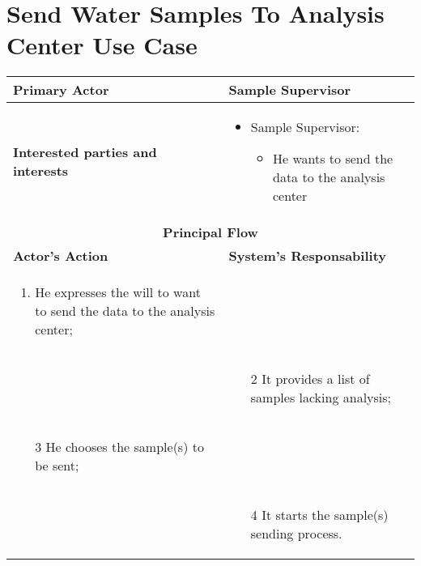 \section{Send Water Samples To Analysis Center Use Case}

\begin{longtable}{|p{7cm}|p{7cm}|}

\hline
\textbf{Primary Actor} & Sample Supervisor\\


\hline
\textbf{Interested parties and interests} &
\begin{itemize}
\item Sample Supervisor:
	\begin{itemize}
 	\item He wants to send the data to the analysis center
	\end{itemize}
\end{itemize}
\\


\hline
\multicolumn{2}{|c|}{\textbf{Principal Flow}} \\

\hline
\textbf{Actor's Action} & \textbf{System's Responsability}\\

\hline

\begin{enumerate}
\item He expresses the will to want to send the data to the analysis center;
\end{enumerate} &\\

& 
\begin{enumerate}
\item[2]It provides a list of samples lacking analysis;
\end{enumerate}\\

\begin{enumerate}
\item[3]He chooses the sample(s) to be sent;			
\end{enumerate} &\\


& 
\begin{enumerate}
\item[4]It starts the sample(s) sending process.
\end{enumerate}\\

\hline
\end{longtable}

